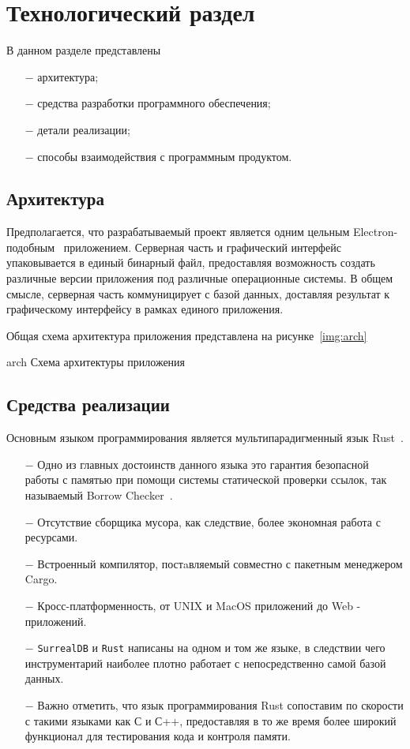 \section{Технологический раздел}

В данном разделе представлены 
\begin{itemize}
    \item[$-$] архитектура;
    \item[$-$] средства разработки программного обеспечения;
    \item[$-$] детали реализации;
    \item[$-$] способы взаимодействия с программным продуктом.
\end{itemize}

\subsection{Архитектура}
Предполагается, что разрабатываемый проект является одним цельным Electron-подобным~\cite{electron} приложением.
Серверная часть и графический интерфейс упаковывается в единый бинарный файл, предоставляя возможность создать различные версии приложения под различные операционные системы.
В общем смысле, серверная часть коммуницирует с базой данных, доставляя результат к графическому интерфейсу в рамках единого приложения.

Общая схема архитектура приложения представлена на рисунке~\ref{img:arch}

\img{95mm}
{arch}
{Схема архитектуры приложения}

\subsection{Средства реализации}

Основным языком программирования является мультипарадигменный язык Rust~\cite{rust}.
\begin{itemize}
    \item[$-$] Одно из главных достоинств данного языка это гарантия безопасной работы с памятью при помощи системы
    статической проверки ссылок, так называемый Borrow Checker~\cite{borrow-checker}.
    \item[$-$] Отсутствие сборщика мусора, как следствие, более экономная работа с ресурсами.
    \item[$-$] Встроенный компилятор, постaвляемый совместно с пакетным менеджером Cargo.
    \item[$-$] Кросс-платформенность, от UNIX и MacOS приложений до Web - приложений.
    \item[$-$] \texttt{SurrealDB} и \texttt{Rust} написаны на одном и том же языке, в следствии чего инструментарий наиболее плотно работает с непосредственно самой базой данных.
    \item[$-$] Важно отметить, что язык программирования Rust сопоставим по скорости с такими языками как С и С++,
    предоставляя в то же время более широкий функционал для тестирования кода и контроля памяти.
\end{itemize}

